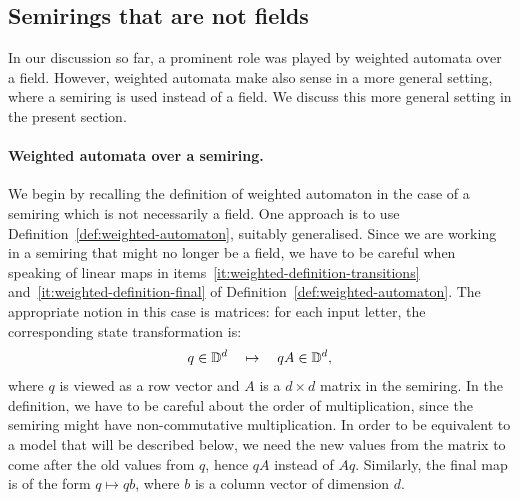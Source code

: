 
\subsection{Semirings that are not fields}
\label{sec:beyond-fields}
In our discussion so far, a prominent role was played by weighted automata over a field. However, weighted automata make also sense in a more general setting, where a semiring is used instead of a field. We discuss this more general setting in the present section.

\paragraph*{Weighted automata over a semiring.}
We begin by recalling the definition  of weighted automaton  in the case of a semiring which is not necessarily a field. One approach is to use Definition~\ref{def:weighted-automaton}, suitably generalised. Since we are working in a semiring that might no longer be a field, we have to be careful when speaking of linear maps in items~\ref{it:weighted-definition-transitions} and~\ref{it:weighted-definition-final} of Definition~\ref{def:weighted-automaton}. The appropriate notion in this case is matrices: for each input letter, the corresponding state transformation is: 
\begin{align*}
q \in \mathbb D^d \quad \mapsto \quad qA \in \mathbb D^d,
\end{align*}
where $q$ is viewed as a row vector and $A$ is a $d \times d$ matrix in the semiring. In the definition, we have to be careful about the order of multiplication, since the semiring might have non-commutative multiplication. In order to be equivalent to a model that will be described below,  we need the new values from the matrix to come after the old values from $q$, hence $qA$ instead of $Aq$.  Similarly, the final map is of the form $q \mapsto q b$, where $b$ is a column vector of dimension $d$.

